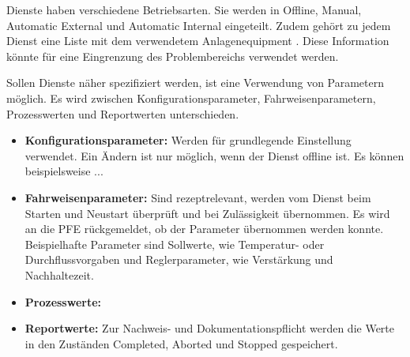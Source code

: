 Dienste haben verschiedene Betriebsarten. Sie werden in Offline, Manual, Automatic External und Automatic Internal eingeteilt. Zudem gehört zu jedem Dienst eine Liste mit dem verwendetem Anlagenequipment . Diese Information könnte für eine Eingrenzung des Problembereichs verwendet werden.

Sollen Dienste näher spezifiziert werden, ist eine Verwendung von Parametern möglich. Es wird zwischen Konfigurationsparameter, Fahrweisenparametern, Prozesswerten und Reportwerten unterschieden. 
\begin{itemize}
\item \textbf{Konfigurationsparameter:} Werden für grundlegende Einstellung verwendet. Ein Ändern ist nur möglich, wenn der Dienst offline ist. Es können beispielsweise ...
\item \textbf{Fahrweisenparameter:} Sind rezeptrelevant, werden vom Dienst beim Starten und Neustart überprüft und bei Zulässigkeit übernommen. Es wird an die PFE rückgemeldet, ob der Parameter übernommen werden konnte. Beispielhafte Parameter sind Sollwerte, wie Temperatur- oder Durchflussvorgaben und Reglerparameter, wie Verstärkung und Nachhaltezeit.
\item \textbf{Prozesswerte:} 
\item \textbf{Reportwerte:} Zur Nachweis- und Dokumentationspflicht werden die Werte in den Zuständen Completed, Aborted und Stopped gespeichert.
\end{itemize}

